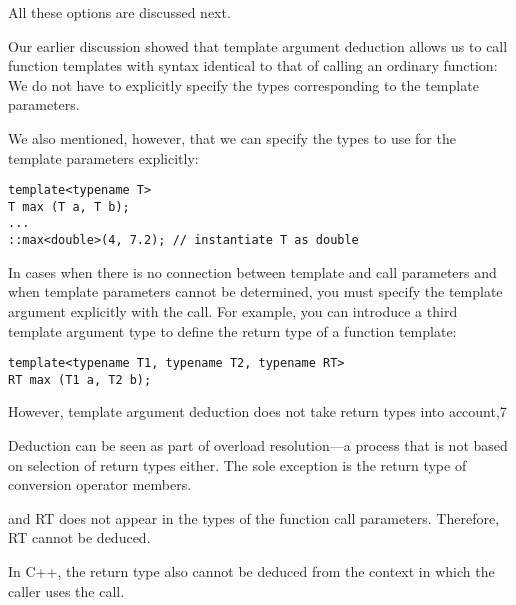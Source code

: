 All these options are discussed next.


Our earlier discussion showed that template argument deduction allows us to call function templates with syntax identical to that of calling an ordinary function: We do not have to explicitly specify the types corresponding to the template parameters.

We also mentioned, however, that we can specify the types to use for the template parameters explicitly:

\begin{lstlisting}[style=styleCXX]
template<typename T>
T max (T a, T b);
...
::max<double>(4, 7.2); // instantiate T as double
\end{lstlisting}

In cases when there is no connection between template and call parameters and when template parameters cannot be determined, you must specify the template argument explicitly with the call. For example, you can introduce a third template argument type to define the return type of a function template:

\begin{lstlisting}[style=styleCXX]
template<typename T1, typename T2, typename RT>
RT max (T1 a, T2 b);
\end{lstlisting}

However, template argument deduction does not take return types into account,7 

\begin{tcolorbox}[colback=webgreen!5!white,colframe=webgreen!75!black]
\hspace*{0.75cm}Deduction can be seen as part of overload resolution—a process that is not based on selection of return types either. The sole exception is the return type of conversion operator members.
\end{tcolorbox}

and RT does not appear in the types of the function call parameters. Therefore, RT cannot be deduced.

\begin{tcolorbox}[colback=webgreen!5!white,colframe=webgreen!75!black]
\hspace*{0.75cm}In C++, the return type also cannot be deduced from the context in which the caller uses the call.
\end{tcolorbox}

